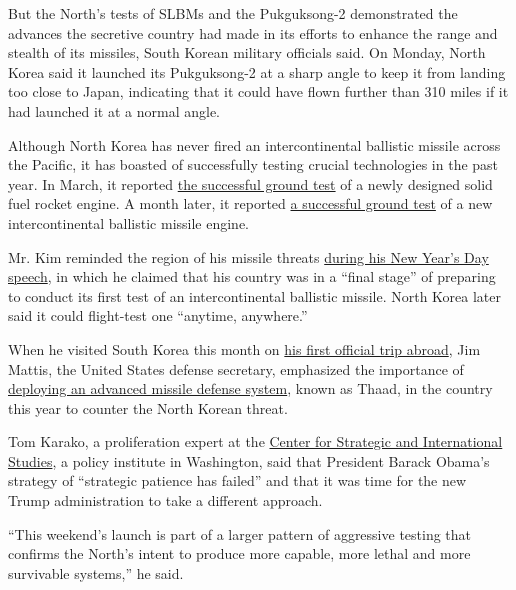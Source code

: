 But the North's tests of SLBMs and the Pukguksong-2 demonstrated the
advances the secretive country had made in its efforts to enhance the
range and stealth of its missiles, South Korean military officials said.
On Monday, North Korea said it launched its Pukguksong-2 at a sharp
angle to keep it from landing too close to Japan, indicating that it
could have flown further than 310 miles if it had launched it at a
normal angle.

Although North Korea has never fired an intercontinental ballistic
missile across the Pacific, it has boasted of successfully testing
crucial technologies in the past year. In March, it reported
\href{https://www.nytimes.com/2016/03/25/world/asia/north-korea-solid-fuel-rocket-engine.html}{the
successful ground test} of a newly designed solid fuel rocket engine. A
month later, it reported
\href{https://www.nytimes.com/2016/04/10/world/asia/north-korea-says-it-successfully-tested-missile-engine.html}{a
successful ground test} of a new intercontinental ballistic missile
engine.

Mr. Kim reminded the region of his missile threats
\href{https://www.nytimes.com/2017/01/01/world/asia/north-korea-intercontinental-ballistic-missile-test-kim-jong-un.html}{during
his New Year's Day speech}, in which he claimed that his country was in
a ``final stage'' of preparing to conduct its first test of an
intercontinental ballistic missile. North Korea later said it could
flight-test one ``anytime, anywhere.''

When he visited South Korea this month on
\href{https://www.nytimes.com/2017/02/05/us/politics/jim-mattis-south-korea-japan.html}{his
first official trip abroad}, Jim Mattis, the United States defense
secretary, emphasized the importance of
\href{https://www.nytimes.com/2017/02/02/world/asia/james-mattis-us-korea-thaad.html}{deploying
an advanced missile defense system}, known as Thaad, in the country this
year to counter the North Korean threat.

Tom Karako, a proliferation expert at the
\href{https://www.csis.org/}{Center for Strategic and International
Studies}, a policy institute in Washington, said that President Barack
Obama's strategy of ``strategic patience has failed'' and that it was
time for the new Trump administration to take a different approach.

``This weekend's launch is part of a larger pattern of aggressive
testing that confirms the North's intent to produce more capable, more
lethal and more survivable systems,'' he said.

